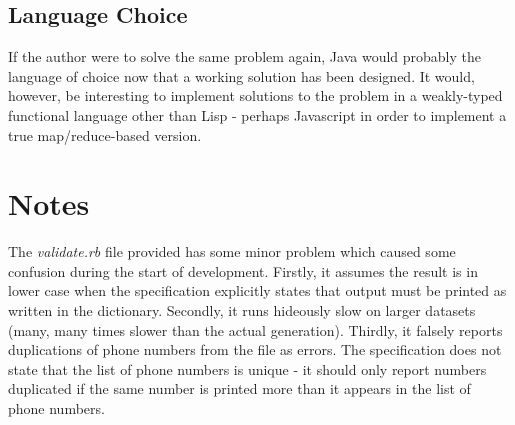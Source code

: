 \documentclass[a4paper,10pt]{article}
\begin{document}
\subsection{Language Choice}
If the author were to solve the same problem again, Java would probably the language of choice now that a working solution has been designed. It would, however, be interesting to implement solutions to the problem in a weakly-typed functional language other than Lisp - perhaps Javascript in order to implement a true map/reduce-based version. 

\section{Notes}
The \emph{validate.rb} file provided has some minor problem which caused some confusion during the start of development. Firstly, it assumes the result is in lower case when the specification explicitly states that output must be printed as written in the dictionary. Secondly, it runs hideously slow on larger datasets (many, many times slower than the actual generation). Thirdly, it falsely reports duplications of phone numbers from the file as errors. The specification does not state that the list of phone numbers is unique - it should only report numbers duplicated if the same number is printed more than it appears in the list of phone numbers.
\end{document}
